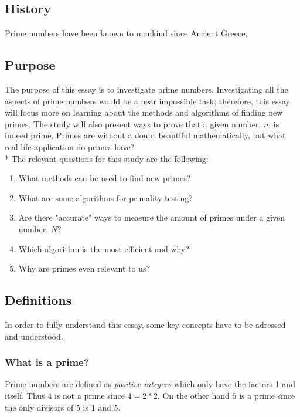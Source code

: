 \documentclass[main.tex]{subfiles}
\begin{document}
\subsection{History}
Prime numbers have been known to mankind since Ancient Greece, \cite{prime}




\subsection{Purpose}
The purpose of this essay is to investigate prime numbers. Investigating all the aspects of prime numbers would be a near impossible task; therefore, this essay will focus more on learning about the methods and algorithms of finding new primes. The study will also present ways to prove that a given number, $n$, is indeed prime. Primes are without a doubt beautiful mathematically, but what real life application do primes have?
\newline
\\*
The relevant questions for this study are the following:
\begin{enumerate}
    \item What methods can be used to find new primes?
    \item What are some algorithms for primality testing?
    \item Are there "accurate" ways to measure the amount of primes under a given number, $N$?
    \item Which algorithm is the most efficient and why?
    \item Why are primes even relevant to us?
\end{enumerate}

\subsection{Definitions}
In order to fully understand this essay, some key concepts have to be adressed and understood.

\subsubsection{What is a prime?}
Prime numbers are defined as \textit{positive integers} which only have the factors 1 and itself. Thus $4$ is not a prime since $4 = 2 * 2$. On the other hand $5$ is a prime since the only divisors of $5$ is $1$ and $5$. 
\end{document}
